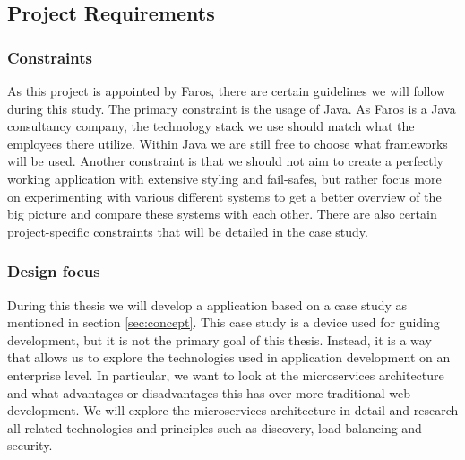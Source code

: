 \documentclass[12pt]{article}
\begin{document}
\begin{multicols}{2}
\subsection{Project Requirements}
\subsubsection{Constraints}
As this project is appointed by Faros, there are certain guidelines we will follow during this study. The primary constraint is the usage of Java. As Faros is a Java consultancy company, the technology stack we use should match what the employees there utilize. Within Java we are still free to choose what frameworks will be used. Another constraint is that we should not aim to create a perfectly working application with extensive styling and fail-safes, but rather focus more on experimenting with various different systems to get a better overview of the big picture and compare these systems with each other. There are also certain project-specific constraints that will be detailed in the case study.
\subsubsection{Design focus}
During this thesis we will develop a application based on a case study as mentioned in section \ref{sec:concept}. This case study is a device used for guiding development, but it is not the primary goal of this thesis. Instead, it is a way that allows us to explore the technologies used in application development on an enterprise level. In particular, we want to look at the microservices architecture and what advantages or disadvantages this has over more traditional web development. We will explore the microservices architecture in detail and research all related technologies and principles such as discovery, load balancing and security.



\end{multicols}
\end{document}
